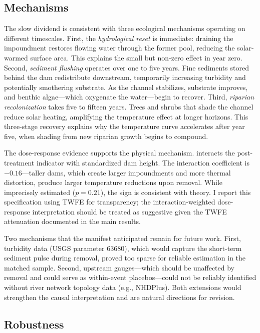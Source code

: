 \documentclass[12pt]{article}
\begin{document}
\subsection{Mechanisms}

The slow dividend is consistent with three ecological mechanisms operating on different timescales. First, the \textit{hydrological reset} is immediate: draining the impoundment restores flowing water through the former pool, reducing the solar-warmed surface area. This explains the small but non-zero effect in year zero. Second, \textit{sediment flushing} operates over one to five years. Fine sediments stored behind the dam redistribute downstream, temporarily increasing turbidity and potentially smothering substrate. As the channel stabilizes, substrate improves, and benthic algae---which oxygenate the water---begin to recover. Third, \textit{riparian recolonization} takes five to fifteen years. Trees and shrubs that shade the channel reduce solar heating, amplifying the temperature effect at longer horizons. This three-stage recovery explains why the temperature curve accelerates after year five, when shading from new riparian growth begins to compound.

The dose-response evidence supports the physical mechanism.  interacts the post-treatment indicator with standardized dam height. The interaction coefficient is $-0.16$---taller dams, which create larger impoundments and more thermal distortion, produce larger temperature reductions upon removal. While imprecisely estimated ($p = 0.21$), the sign is consistent with theory. I report this specification using TWFE for transparency; the interaction-weighted dose-response interpretation should be treated as suggestive given the TWFE attenuation documented in the main results.



Two mechanisms that the manifest anticipated remain for future work. First, turbidity data (USGS parameter 63680), which would capture the short-term sediment pulse during removal, proved too sparse for reliable estimation in the matched sample. Second, upstream gauges---which should be unaffected by removal and could serve as within-event placebos---could not be reliably identified without river network topology data (e.g., NHDPlus). Both extensions would strengthen the causal interpretation and are natural directions for revision.

\subsection{Robustness}
\end{document}
